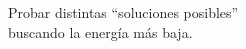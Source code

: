 \documentclass[preview]{standalone}
\begin{document}
\begin{center}
Probar distintas ``soluciones posibles''\\buscando la energía más baja.
\end{center}
\end{document}
